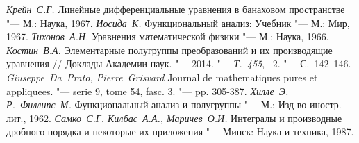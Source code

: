 \documentclass{cmfnre}
\theoremstyle{plain}
\numberwithin{equation}{section}
\begin{document}
\clearpage

\begin{thebibliography}{99}
     {\it Крейн~С.Г.} Линейные дифференциальные уравнения в банаховом пространстве "--- М.: Наука, 1967.
     {\it Иосида~К.} Функциональный анализ: Учебник "--- М.: Мир, 1967.
     {\it Тихонов~А.Н.} Уравнения математической физики "--- М.: Наука, 1966.
     {\it Костин~В.А.} Элементарные полугруппы преобразований и их производящие уравнения // Доклады Академии наук. "--- 2014. "--- {\sl Т.~455}, \No~2. "--- С.~142--146.
     {\it Giuseppe~Da~Prato, Pierre~Grisvard} Journal de mathematiques pures et appliquees. "--- serie 9, tome 54, fasc. 3. "--- pp. 305-387.
     {\it Хилле~Э. Р.~Филлипс~М.} Функциональный анализ и полугруппы "--- М.: Изд-во иностр. лит., 1962.
     {\it Самко~С.Г. Килбас~А.А., Маричев~О.И.} Интегралы и производные дробного порядка и некоторые их приложения "--- Минск: Наука и техника, 1987.
\end{thebibliography}
\end{document}
